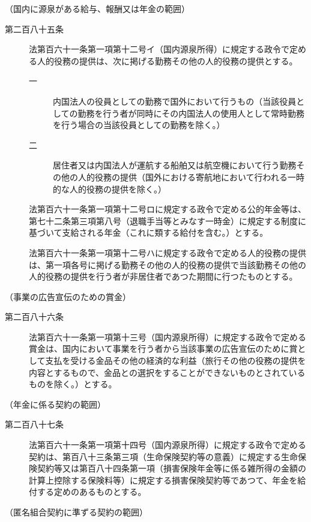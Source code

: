 \documentclass[twocolumn,a4j,10pt]{ltjtarticle}
\begin{document}
\noindent\hspace{10pt}（国内に源泉がある給与、報酬又は年金の範囲）
\begin{description}
\item[第二百八十五条]法第百六十一条第一項第十二号イ（国内源泉所得）に規定する政令で定める人的役務の提供は、次に掲げる勤務その他の人的役務の提供とする。
\begin{description}
\item[一]内国法人の役員としての勤務で国外において行うもの（当該役員としての勤務を行う者が同時にその内国法人の使用人として常時勤務を行う場合の当該役員としての勤務を除く。）
\item[二]居住者又は内国法人が運航する船舶又は航空機において行う勤務その他の人的役務の提供（国外における寄航地において行われる一時的な人的役務の提供を除く。）
\end{description}
\item[]法第百六十一条第一項第十二号ロに規定する政令で定める公的年金等は、第七十二条第三項第八号（退職手当等とみなす一時金）に規定する制度に基づいて支給される年金（これに類する給付を含む。）とする。
\item[]法第百六十一条第一項第十二号ハに規定する政令で定める人的役務の提供は、第一項各号に掲げる勤務その他の人的役務の提供で当該勤務その他の人的役務の提供を行う者が非居住者であつた期間に行つたものとする。
\end{description}
\noindent\hspace{10pt}（事業の広告宣伝のための賞金）
\begin{description}
\item[第二百八十六条]法第百六十一条第一項第十三号（国内源泉所得）に規定する政令で定める賞金は、国内において事業を行う者から当該事業の広告宣伝のために賞として支払を受ける金品その他の経済的な利益（旅行その他の役務の提供を内容とするもので、金品との選択をすることができないものとされているものを除く。）とする。
\end{description}
\noindent\hspace{10pt}（年金に係る契約の範囲）
\begin{description}
\item[第二百八十七条]法第百六十一条第一項第十四号（国内源泉所得）に規定する政令で定める契約は、第百八十三条第三項（生命保険契約等の意義）に規定する生命保険契約等又は第百八十四条第一項（損害保険年金等に係る雑所得の金額の計算上控除する保険料等）に規定する損害保険契約等であつて、年金を給付する定めのあるものとする。
\end{description}
\noindent\hspace{10pt}（匿名組合契約に準ずる契約の範囲）
\end{document}
